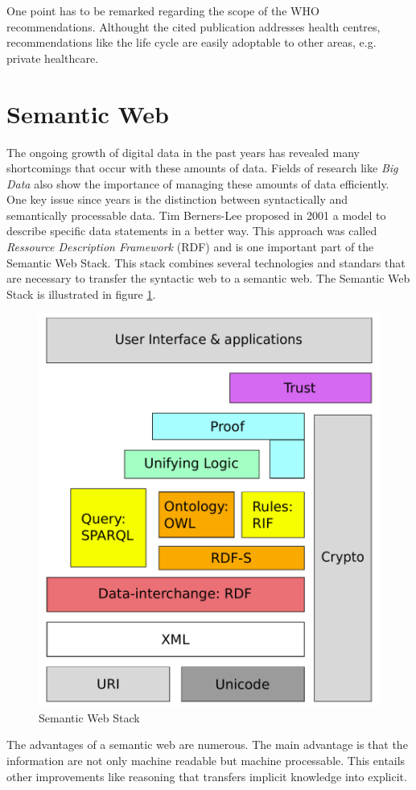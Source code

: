 One point has to be remarked regarding the scope of the WHO recommendations.
Althought the cited publication addresses health centres, recommendations like the life cycle are easily adoptable to other areas, e.g. private healthcare.

\section{Semantic Web}
\label{sec:semantic-web}
The ongoing growth of digital data in the past years has revealed many shortcomings that occur with these amounts of data.
Fields of research like \textit{Big Data} also show the importance of managing these amounts of data efficiently.
One key issue since years is the distinction between syntactically and semantically processable data.
Tim Berners-Lee proposed in 2001 a model to describe specific data statements in a better way.
This approach was called \textit{Ressource Description Framework} (RDF) and is one important part of the Semantic Web Stack.
This stack combines several technologies and standars that are necessary to transfer the syntactic web to a semantic web.
The Semantic Web Stack is illustrated in figure \ref{fig:sem_stack}.
\begin{figure}
  \centering
  \includegraphics[scale=0.3]{preliminaries/semweb_stack}
  \caption{Semantic Web Stack}
  \label{fig:sem_stack}
\end{figure}
The advantages of a semantic web are numerous.
The main advantage is that the information are not only machine readable but machine processable.
This entails other improvements like reasoning that transfers implicit knowledge into explicit.

